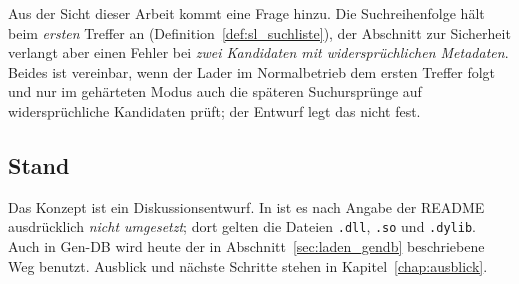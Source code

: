 Aus der Sicht dieser Arbeit kommt eine Frage hinzu. Die Suchreihenfolge hält beim \emph{ersten} Treffer an (Definition~\ref{def:sl_suchliste}), der Abschnitt zur Sicherheit verlangt aber einen Fehler bei \emph{zwei Kandidaten mit widersprüchlichen Metadaten}. Beides ist vereinbar, wenn der Lader im Normalbetrieb dem ersten Treffer folgt und nur im gehärteten Modus auch die späteren Suchursprünge auf widersprüchliche Kandidaten prüft; der Entwurf legt das nicht fest.

\subsection{Stand}

Das Konzept ist ein Diskussionsentwurf. In  ist es nach Angabe der README ausdrücklich \emph{nicht umgesetzt}; dort gelten die Dateien \texttt{.dll}, \texttt{.so} und \texttt{.dylib}. Auch in Gen-DB wird heute der in Abschnitt~\ref{sec:laden_gendb} beschriebene Weg benutzt. Ausblick und nächste Schritte stehen in Kapitel~\ref{chap:ausblick}.
